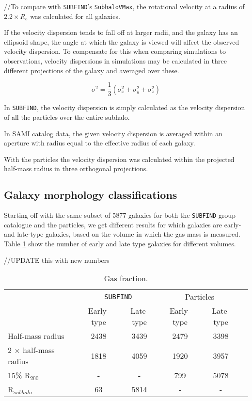//To compare with \texttt{SUBFIND}'s \texttt{SubhaloVMax}, the rotational velocity at a radius of $2.2 \times R_e$ was calculated for all galaxies.



If the velocity dispersion tends to fall off at larger radii, and the galaxy has an ellipsoid shape, the angle at which the galaxy is viewed will affect the observed velocity dispersion. To compensate for this when comparing simulations to observations, velocity dispersions in simulations may be calculated in three different projections of the galaxy and averaged over these. 

\begin{equation} \label{sigma1}
    \sigma^{2} = \frac{1}{3}(\sigma_x^2 + \sigma_y^2 + \sigma_z^2)
\end{equation}



In \texttt{SUBFIND}, the velocity dispersion is simply calculated as the velocity dispersion of all the particles over the entire subhalo.

In SAMI catalog data, the given velocity dispersion is averaged within an aperture with radius equal to the effective radius of each galaxy.

With the particles the velocity dispersion was calculated within the projected half-mass radius in three orthogonal projections.


\subsection{Galaxy morphology classifications}

Starting off with the same subset of 5877 galaxies for both the \texttt{SUBFIND} group catalogue and the particles, we get different results for which galaxies are early- and late-type galaxies, based on the volume in which the gas mass is measured. Table \ref{gas_frac} show the number of early and late type galaxies for different volumes.

//UPDATE this with new numbers

\begin{table}
\begin{center}
\caption{Gas fraction.}
 \label{gas_frac}
\begin{tabular}{ l| c c c c c } 
 \hline
 \hline
   &\multicolumn{2}{c}{\texttt{SUBFIND}}&\multicolumn{2}{c}{Particles} \\
   &  Early-type & Late-type & Early-type & Late-type \\
 \hline
 Half-mass radius & 2438 & 3439 & 2479 & 3398 \\ 
 2 $\times$ half-mass radius & 1818 & 4059 & 1920 & 3957 \\ 
 15\% R$_{200}$ & - & - & 799 & 5078 \\ 
 R$_{subhalo}$ & 63 & 5814 & - & - \\ 
 \hline 
 \end{tabular}
\end{center}
\end{table}

